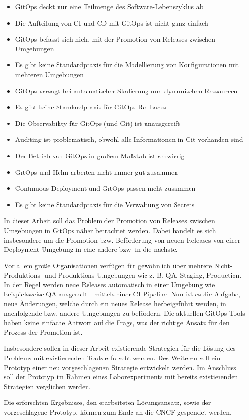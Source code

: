 \begin{itemize}
	\item GitOps deckt nur eine Teilmenge des Software-Lebenszyklus ab
	\item Die Aufteilung von CI und CD mit GitOps ist nicht ganz einfach
	\item GitOps befasst sich nicht mit der Promotion von Releases zwischen Umgebungen
	\item Es gibt keine Standardpraxis für die Modellierung von Konfigurationen mit mehreren Umgebungen
	\item GitOps versagt bei automatischer Skalierung und dynamischen Ressourcen
	\item Es gibt keine Standardpraxis für GitOps-Rollbacks
	\item Die Observability für GitOps (und Git) ist unausgereift
	\item Auditing ist problematisch, obwohl alle Informationen in Git vorhanden sind
	\item Der Betrieb von GitOps in großem Maßstab ist schwierig
	\item GitOps und Helm arbeiten nicht immer gut zusammen
	\item Continuous Deployment und GitOps passen nicht zusammen
	\item Es gibt keine Standardpraxis für die Verwaltung von Secrets
\end{itemize}

\autocite{codefreshGitopsPains10}
\bigskip




\noindent
In dieser Arbeit soll das Problem der
Promotion von Releases zwischen Umgebungen in GitOps
näher betrachtet werden.
Dabei handelt es sich insbesondere um
die Promotion bzw. Beförderung von neuen Releases
von einer Deployment-Umgebung in eine andere bzw. in die nächste.
\bigskip

\noindent
Vor allem große Organisationen verfügen für gewöhnlich über mehrere
Nicht-Produktions- und Produktions-Umgebungen
wie z. B. QA, Staging, Production.
In der Regel werden neue Releases automatisch in einer Umgebung
wie beispielsweise QA ausgerollt - mittels einer CI-Pipeline.
Nun ist es die Aufgabe,
neue Änderungen, welche durch ein neues Release herbeigeführt werden,
in nachfolgende bzw. andere Umgebungen zu befördern.
Die aktuellen GitOps-Tools haben keine einfache Antwort auf
die Frage, was der richtige Ansatz für den Prozess der Promotion ist.
\bigskip

\noindent
Insbesondere sollen in dieser Arbeit
existierende Strategien für die Lösung des Problems
mit existierenden Tools erforscht werden.
Des Weiteren soll ein Prototyp einer neu vorgeschlagenen
Strategie entwickelt werden.
Im Anschluss soll der Prototyp im Rahmen eines Laborexperiments
mit bereits existierenden Strategien
verglichen werden.
\bigskip

\noindent
Die erforschten Ergebnisse,
den erarbeiteten Lösungsansatz,
sowie der vorgeschlagene Prototyp,
können zum Ende
an die CNCF gespendet werden.
